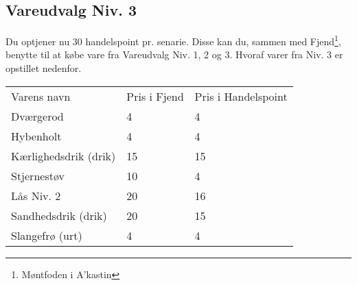 \subsection{Vareudvalg Niv. 3}
Du optjener nu 30 handelspoint pr. senarie. Disse kan du, sammen med Fjend\footnote{Møntfoden i A'kastin}, benytte til at købe vare fra Vareudvalg Niv. 1, 2 og 3. Hvoraf varer fra Niv. 3 er opstillet nedenfor.
\begin{table}[H]
    \centering
    \begin{tabular}{|p{}|p{}|p{}|}
    \hline
    \rowcolor{cerulean!80}
    \multicolumn{3}{c}{Vareudvalg Niv. 3}\\
    \hline
    \rowcolor{cerulean!40}
         Varens navn & Pris i Fjend & Pris i Handelspoint \\\hline
         Dværgerod & 4 & 4\\\hline
         Hybenholt & 4 & 4\\\hline
         Kærlighedsdrik (drik) & 15 & 15\\\hline
         Stjernestøv & 10 & 4 \\\hline
         Lås Niv. 2 & 20 & 16\\\hline
         Sandhedsdrik (drik) & 20 & 15\\\hline
         Slangefrø (urt) & 4 & 4\\\hline
    \end{tabular}
    \end{table}